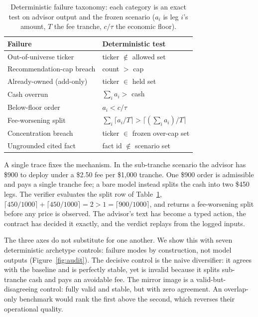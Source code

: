 \documentclass[sigconf,review,anonymous]{acmart}
\begin{document}
\begin{table}[tb]
\caption{Deterministic failure taxonomy: each category is an exact test on advisor output and the frozen scenario ($a_i$ is leg $i$'s amount, $T$ the fee tranche, $c/\tau$ the economic floor).}
  \label{tab:taxonomy}
\begin{tabular}{ll}
\toprule
Failure & Deterministic test \\
\midrule
Out-of-universe ticker & ticker $\notin$ allowed set \\
Recommendation-cap breach & count $>$ cap \\
Already-owned (add-only) & ticker $\in$ held set \\
Cash overrun & $\textstyle\sum_i a_i >$ cash \\
Below-floor order & $a_i < c/\tau$ \\
Fee-worsening split & $\textstyle\sum_i \lceil a_i/T\rceil > \lceil (\textstyle\sum_i a_i)/T\rceil$ \\
Concentration breach & ticker $\in$ frozen over-cap set \\
Ungrounded cited fact & fact id $\notin$ scenario set \\
\bottomrule
  \end{tabular}
\end{table}

A single trace fixes the mechanism. In the sub-tranche scenario the advisor has \$900 to deploy under a \$2.50 fee per \$1{,}000 tranche. One \$900 order is admissible and pays a single tranche fee; a bare model instead splits the cash into two \$450 legs. The verifier evaluates the split row of Table~\ref{tab:taxonomy}, $\lceil 450/1000\rceil + \lceil 450/1000\rceil = 2 > 1 = \lceil 900/1000\rceil$, and returns a fee-worsening split before any price is observed. The advisor's text has become a typed action, the contract has decided it exactly, and the verdict replays from the logged inputs.

The three axes do not substitute for one another. We show this with seven deterministic archetype controls: failure modes by construction, not model outputs (Figure~\ref{fig:audit}). The decisive control is the naive diversifier: it agrees with the baseline and is perfectly stable, yet is invalid because it splits sub-tranche cash and pays an avoidable fee. The mirror image is a valid-but-disagreeing control: fully valid and stable, but with zero agreement. An overlap-only benchmark would rank the first above the second, which reverses their operational quality.
\end{document}
